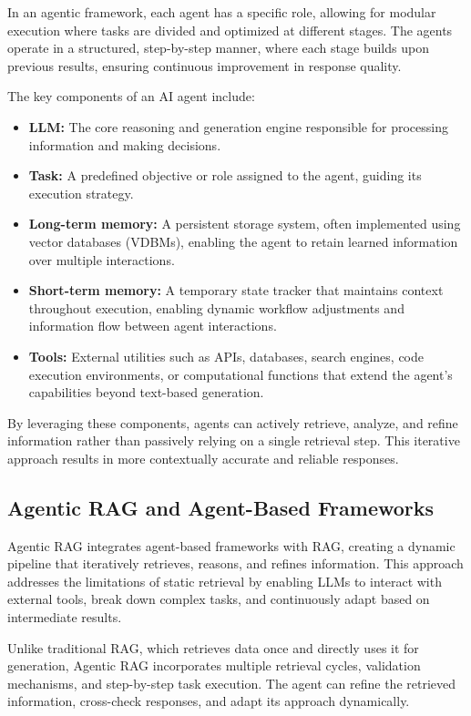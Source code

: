 In an agentic framework, each agent has a specific role, allowing for modular execution where tasks are divided and optimized at different stages. The agents operate in a structured, step-by-step manner, where each stage builds upon previous results, ensuring continuous improvement in response quality.

The key components of an AI agent include:

\begin{itemize}
    \item \textbf{LLM:} The core reasoning and generation engine responsible for processing information and making decisions.
    \item \textbf{Task:} A predefined objective or role assigned to the agent, guiding its execution strategy.
    \item \textbf{Long-term memory:} A persistent storage system, often implemented using vector databases (VDBMs), enabling the agent to retain learned information over multiple interactions.
    \item \textbf{Short-term memory:} A temporary state tracker that maintains context throughout execution, enabling dynamic workflow adjustments and information flow between agent interactions.
    \item \textbf{Tools:} External utilities such as APIs, databases, search engines, code execution environments, or computational functions that extend the agent's capabilities beyond text-based generation.
\end{itemize}

By leveraging these components, agents can actively retrieve, analyze, and refine information rather than passively relying on a single retrieval step. This iterative approach results in more contextually accurate and reliable responses.

\subsection{Agentic RAG and Agent-Based Frameworks}

Agentic RAG integrates agent-based frameworks with RAG, creating a dynamic pipeline that iteratively retrieves, reasons, and refines information. This approach addresses the limitations of static retrieval by enabling LLMs to interact with external tools, break down complex tasks, and continuously adapt based on intermediate results.

Unlike traditional RAG, which retrieves data once and directly uses it for generation, Agentic RAG incorporates multiple retrieval cycles, validation mechanisms, and step-by-step task execution. The agent can refine the retrieved information, cross-check responses, and adapt its approach dynamically.

